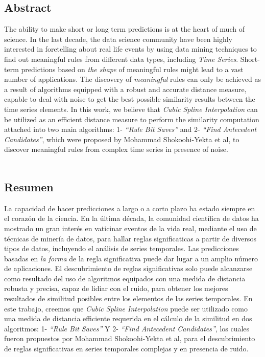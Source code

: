 \subsection*{\textbf{{Abstract}}}
The ability to make short or long term predictions is at the heart of much of science.
In the last decade, the data science community have been highly interested in foretelling about real life events by using data mining techniques to find out meaningful rules from different data types, including \textit{Time Series}. Short-term predictions based on \textit{the shape} of meaningful rules might lead to a vast number of applications. The discovery of \textit{meaningful} rules can only be achieved as a result of algorithms equipped with a robust and accurate distance measure, capable to deal with noise to get the best possible similarity results between the time series elements. In this work, we believe that \textit{Cubic Spline Interpolation} can be utilized as an efficient distance measure to perform the similarity computation attached into two main algorithms: 1- \textit{\enquote{Rule Bit Saves}} and 2- \textit{\enquote{Find Antecedent Candidates}}, which were proposed by Mohammad Shokoohi-Yekta et al, to discover meaningful rules from complex time series in presence of noise.\\\\
\subsection*{\textbf{{Resumen}}}
La capacidad de hacer predicciones a largo o a corto plazo ha estado siempre en el coraz\'on de la ciencia. En la \'ultima d\'ecada, la comunidad cient\'ifica de datos ha mostrado un gran inter\'es en vaticinar eventos de la vida real, mediante el uso de t\'ecnicas de miner\'ia de datos, para hallar reglas significaticas a partir de diversos tipos de datos, incluyendo el an\'alisis de series temporales. Las predicciones basadas en \textit{la forma} de la regla significativa puede dar lugar a un amplio n\'umero de aplicaciones. El descubrimiento de reglas significativas solo puede alcanzarse como resultado del uso de algoritmos equipados con una medida de distancia robusta y precisa, capaz de lidiar con el ruido, para obtener los mejores resultados de similitud posibles entre los elementos de las series temporales. En este trabajo, creemos que \textit{Cubic Spline Interpolation} puede ser utilizado como una medida de distancia efficiente requerida en el c\'alculo de la similitud en dos algoritmos: 1- \textit{\enquote{Rule Bit Saves}} Y 2- \textit{\enquote{Find Antecedent Candidates}}, los cuales fueron propuestos por Mohammad Shokoohi-Yekta et al, para el descubrimiento de reglas significativas en series temporales complejas y en presencia de ruido.